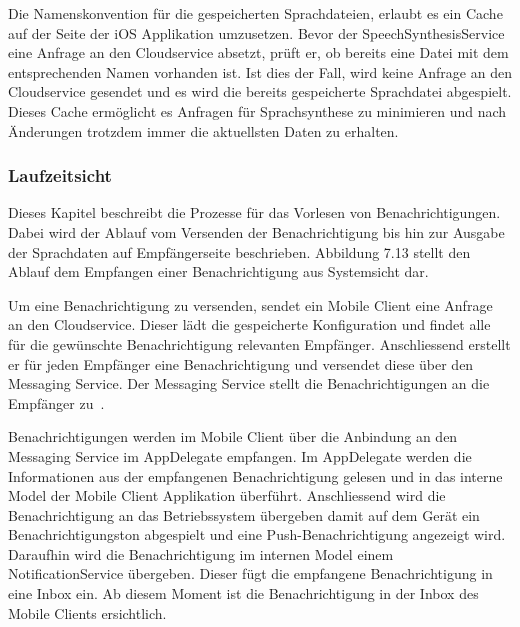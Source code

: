 Die Namenskonvention für die gespeicherten Sprachdateien, erlaubt es ein Cache auf der Seite der iOS Applikation umzusetzen.
Bevor der SpeechSynthesisService eine Anfrage an den Cloudservice absetzt, prüft er, ob bereits eine Datei mit dem entsprechenden Namen vorhanden ist.
Ist dies der Fall, wird keine Anfrage an den Cloudservice gesendet und es wird die bereits gespeicherte Sprachdatei abgespielt.
Dieses Cache ermöglicht es Anfragen für Sprachsynthese zu minimieren und nach Änderungen trotzdem immer die aktuellsten Daten zu erhalten.

\clearpage

\subsubsection{Laufzeitsicht}

Dieses Kapitel beschreibt die Prozesse für das Vorlesen von Benachrichtigungen.
Dabei wird der Ablauf vom Versenden der Benachrichtigung bis hin zur Ausgabe der Sprachdaten auf Empfängerseite beschrieben.
Abbildung 7.13 stellt den Ablauf dem Empfangen einer Benachrichtigung aus Systemsicht dar.

Um eine Benachrichtigung zu versenden, sendet ein Mobile Client eine Anfrage an den Cloudservice.
Dieser lädt die gespeicherte Konfiguration und findet alle für die gewünschte Benachrichtigung relevanten Empfänger.
Anschliessend erstellt er für jeden Empfänger eine Benachrichtigung und versendet diese über den Messaging Service.
Der Messaging Service stellt die Benachrichtigungen an die Empfänger zu~\cite{ip5}.

Benachrichtigungen werden im Mobile Client über die Anbindung an den Messaging Service im AppDelegate empfangen.
Im AppDelegate werden die Informationen aus der empfangenen Benachrichtigung gelesen und in das interne Model der Mobile Client Applikation überführt.
Anschliessend wird die Benachrichtigung an das Betriebssystem übergeben damit auf dem Gerät ein Benachrichtigungston abgespielt und eine Push-Benachrichtigung angezeigt wird.
Daraufhin wird die Benachrichtigung im internen Model einem NotificationService übergeben.
Dieser fügt die empfangene Benachrichtigung in eine Inbox ein.
Ab diesem Moment ist die Benachrichtigung in der Inbox des Mobile Clients ersichtlich.

